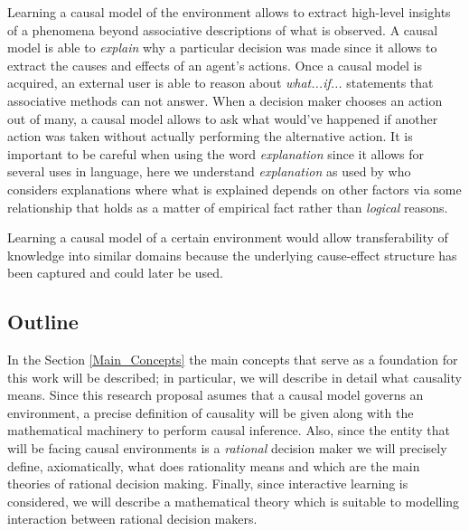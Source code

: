 \documentclass[english,letterpaper,12pt,final]{article}
\theoremstyle{definition}
\begin{document}

Learning a causal model of the environment allows to extract high-level insights of a phenomena beyond associative descriptions of what is observed. A causal model is able to \textit{explain} why a particular decision was made since it allows to extract the causes and effects of an agent's actions. Once a causal model is acquired, an external user is able to reason about \textit{what...if...} statements that associative methods can not answer. When a decision maker chooses an action out of many, a causal model allows to ask what would've happened if another action was taken without actually performing the alternative action. It is important to be careful when using the word \textit{explanation} since it allows for several uses in language, here we understand \textit{explanation} as used by \cite{woodward2005making} who considers explanations where what is explained depends on other factors via some relationship that holds as a matter of empirical fact rather than \textit{logical} reasons.

Learning a causal model of a certain environment would allow transferability of knowledge into similar domains because the underlying cause-effect structure has been captured and could later be used.
\subsection{Outline}
In the Section \ref{Main_Concepts} the main concepts that serve as a foundation for this work will be described; in particular, we will describe in detail what causality means. Since this research proposal asumes that a causal model governs an environment, a precise definition of causality will be given along with the mathematical machinery to perform causal inference. Also, since the entity that will be facing causal environments is a \textit{rational} decision maker we will precisely define, axiomatically, what does rationality means and which are the main theories of rational decision making. Finally, since interactive learning is considered, we will describe a mathematical theory which is suitable to modelling interaction between rational decision makers.
\end{document}
